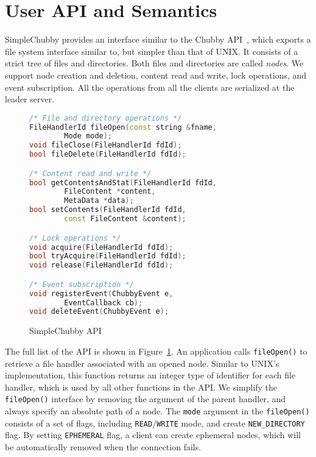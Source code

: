 \section{User API and Semantics}
\label{section:api}

SimpleChubby provides an interface similar to the Chubby API~\cite{burrows2006chubby},
which exports a file system interface similar to, but simpler than that of UNIX.
It consists of a strict tree of files and directories. Both files and directories
are called \emph{nodes}. We support node creation and deletion, content
read and write, lock operations, and event subscription.
All the operations from all the clients are serialized at the leader server.

\begin{figure}
\centering
\begin{lstlisting}[language=C++,
    basicstyle=\footnotesize\ttfamily,
    commentstyle=\bfseries,
    deletekeywords={delete},
    morekeywords={FileHandlerId, string, Mode, FileContent, MetaData, ChubbyEvent, EventCallback}]
/* File and directory operations */
FileHandlerId fileOpen(const string &fname,
        Mode mode);
void fileClose(FileHandlerId fdId);
bool fileDelete(FileHandlerId fdId);

/* Content read and write */
bool getContentsAndStat(FileHandlerId fdId,
        FileContent *content,
        MetaData *data);
bool setContents(FileHandlerId fdId,
        const FileContent &content);

/* Lock operations */
void acquire(FileHandlerId fdId);
bool tryAcquire(FileHandlerId fdId);
void release(FileHandlerId fdId);

/* Event subscription */
void registerEvent(ChubbyEvent e,
        EventCallback cb);
void deleteEvent(ChubbyEvent e);
\end{lstlisting}
\caption{SimpleChubby API}
\label{fig:api}
\end{figure}

The full list of the API is shown in Figure~\ref{fig:api}.
An application calls \texttt{fileOpen()} to retrieve a file handler
associated with an opened node. Similar to UNIX's implementation,
this function returns an integer type of identifier for each file handler,
which is used by all other functions in the API.
We simplify the \texttt{fileOpen()} interface by removing the argument of
the parent handler, and always specify an absolute path of a node.
The \texttt{mode} argument in the \texttt{fileOpen()} consists of a set of flags,
including \texttt{READ}/\texttt{WRITE} mode, and create \texttt{NEW\_DIRECTORY} flag.
By setting \texttt{EPHEMERAL} flag, a client can create ephemeral nodes,
which will be automatically removed when the connection fails.

